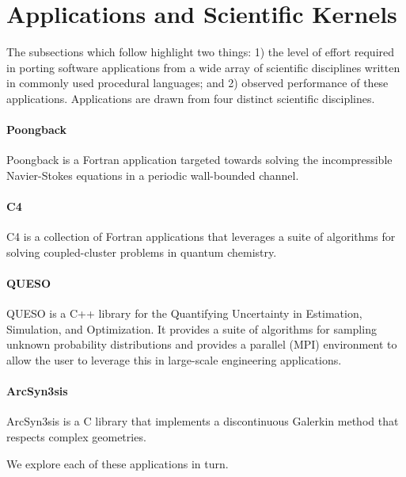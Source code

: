 \section{Applications and Scientific Kernels}
\label{sec:apps}

The subsections which follow highlight two things: 1) the level of effort
required in porting software applications from a wide array of scientific
disciplines written in commonly used procedural languages; and 2) observed
performance of these applications.  Applications are drawn from four distinct
scientific disciplines.

\paragraph{Poongback}  Poongback is a Fortran application targeted towards
solving the incompressible Navier-Stokes equations in a periodic wall-bounded
channel.

\paragraph{C4}  C4 is a collection of Fortran applications that leverages a
suite of algorithms for solving coupled-cluster problems in quantum chemistry.

\paragraph{QUESO}  QUESO is a C++ library for the Quantifying Uncertainty in
Estimation, Simulation, and Optimization.  It provides a suite of algorithms
for sampling unknown probability distributions and provides a parallel (MPI)
environment to allow the user to leverage this in large-scale engineering
applications.

\paragraph{ArcSyn3sis}  ArcSyn3sis is a C library that implements a
discontinuous Galerkin method that respects complex geometries.

We explore each of these applications in turn.
